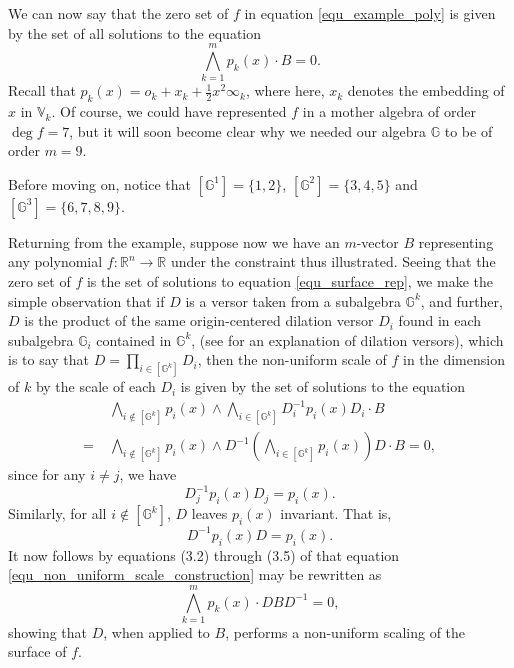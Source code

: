 \documentclass{birkjour}
\theoremstyle{definition}
\theoremstyle{remark}
\numberwithin{equation}{section}
\newcommand{\R}{\mathbb{R}}
\newcommand{\G}{\mathbb{G}}
\newcommand{\V}{\mathbb{V}}
\newcommand{\nvai}{\infty}
\newcommand{\nvao}{o}
\begin{document}
We can now say that the zero set of $f$ in equation \eqref{equ_example_poly}
is given by the set of all solutions to the equation
\begin{equation}\label{equ_surface_rep}
\bigwedge_{k=1}^m p_k(x)\cdot B = 0.
\end{equation}
Recall that $p_k(x)=\nvao_k+x_k+\frac{1}{2}x^2\nvai_k$, where here,
$x_k$ denotes the embedding of $x$ in $\V_k$.
Of course, we could have represented $f$ in a mother algebra of order $\deg f=7$,
but it will soon become clear why we needed our algebra $\G$ to be of order $m=9$.

Before moving on, notice that $[\G^1]=\{1,2\}$, $[\G^2]=\{3,4,5\}$ and
$[\G^3]=\{6,7,8,9\}$.

Returning from the example, suppose now we have an $m$-vector $B$ representing
any polynomial $f:\R^n\to\R$ under the constraint thus illustrated.  Seeing that
the zero set of $f$ is the set of solutions to equation \eqref{equ_surface_rep},
we make the simple observation that if $D$ is a versor taken from a subalgebra $\G^k$,
and further, $D$ is the product of the same origin-centered dilation versor $D_i$ found in each subalgebra
$\G_i$ contained in $\G^k$, (see \cite{Dorst07} for an explanation of dilation versors),
which is to say that $D=\prod_{i\in [\G^k]} D_i$,
then the non-uniform scale of $f$ in the dimension of $k$ by the scale of each
$D_i$ is given by the set of solutions to the equation
\begin{align}
  & \bigwedge_{i\not\in [\G^k]} p_i(x)\wedge\bigwedge_{i\in[\G^k]} D_i^{-1}p_i(x)D_i\cdot B \nonumber \\
 =\; & \bigwedge_{i\not\in [\G^k]} p_i(x)\wedge D^{-1}\left(\bigwedge_{i\in [\G^k]} p_i(x)\right)D\cdot B = 0,\label{equ_non_uniform_scale_construction}
\end{align}
since for any $i\neq j$, we have
\begin{equation*}
D_j^{-1}p_i(x)D_j=p_i(x).
\end{equation*}
Similarly, for all $i\not\in[\G^k]$, $D$ leaves $p_i(x)$ invariant.  That is,
\begin{equation*}
D^{-1}p_i(x)D=p_i(x).
\end{equation*}
It now follows by equations (3.2) through (3.5) of \cite{Parkin13} that equation \eqref{equ_non_uniform_scale_construction}
may be rewritten as
\begin{equation*}
\bigwedge_{k=1}^m p_k(x)\cdot DBD^{-1} = 0,
\end{equation*}
showing that $D$, when applied to $B$, performs a non-uniform scaling of the surface of $f$.
\end{document}
